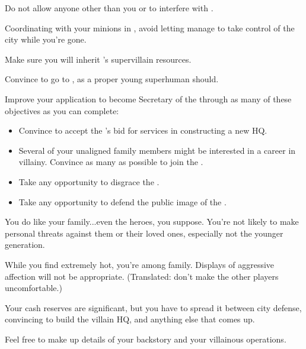 \documentclass[char]{LRSguildcamp1}
\begin{document}
\begin{itemz}[Goals]
	\item Do not allow anyone other than you or \cOS{} to interfere with \pCityO{}.  %
	\item Coordinating with your minions in \pCityO{}, avoid letting \cOS{} manage to take control of the city while you're gone.
	\item Make sure you will inherit \cGrandma{}'s supervillain resources. %
	\item Convince \cTween{} to go to \pSuperSchool{}, as a proper young superhuman should.
	\item Improve your application to become Secretary of the \cVillainCompact{\intro} through as many of these objectives as you can complete:
	\begin{itemize}
		\item Convince \cArchitect{} to accept the \cVillainCompact{}'s bid for \cArchitect{\their} services in constructing a new HQ.
		\item Several of your unaligned family members might be interested in a career in villainy.  Convince as many as possible to join the \cVillainCompact{\intro}.
		\item Take any opportunity to disgrace the \cHeroLeague{\intro}.
		\item Take any opportunity to defend the public image of the \cVillainCompact{}.  %
	\end{itemize}
\end{itemz}

\begin{itemz}[Notes]
	\item You do like your family...even the heroes, you suppose.  You're not likely to make personal threats against them or their loved ones, especially not the younger generation.  %
	\item While you find \cOS{} extremely hot, you're among family.  Displays of aggressive affection will not be appropriate.  (Translated: don't make the other players uncomfortable.)
	\item Your cash reserves are significant, but you have to spread it between city defense, convincing \cArchitect{} to build the villain HQ, and anything else that comes up.
	\item Feel free to make up details of your backstory and your villainous operations.
\end{itemz}
\end{document}
